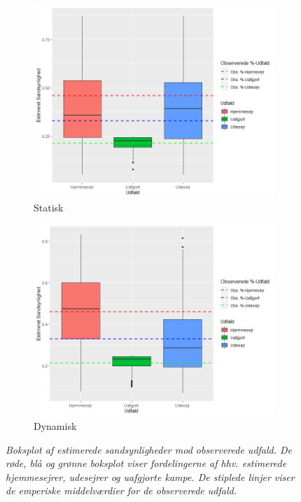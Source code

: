 \documentclass[11pt,a4paper]{article}
\begin{document}
\begin{figure}[h!]
  \centering
  \begin{subfigure}[b]{0.475\linewidth}
    \includegraphics[width=\linewidth]{EstSSHStatisk.png}
    \caption{Statisk}
    \label{fig:boxplotS}
  \end{subfigure}
  \begin{subfigure}[b]{0.475\linewidth}
    \includegraphics[width=\linewidth]{EstSSHDyn.png}
    \caption{Dynamisk}
    \label{fig:boxplotD}
  \end{subfigure}
  \caption{\textit{Boksplot af estimerede sandsynligheder mod observerede udfald. De røde, blå og grønne boksplot viser fordelingerne af hhv. estimerede hjemmesejrer, udesejrer og uafgjorte kampe. De stiplede linjer viser de emperiske middelværdier for de observerede udfald.}}
  \label{fig:boxplot}
\end{figure}
\end{document}
